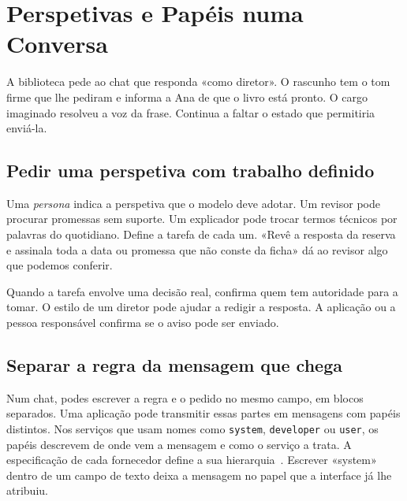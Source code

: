 \chapter{Perspetivas e Papéis numa Conversa}
\label{ch:personas}

\ficcao A biblioteca pede ao chat que responda «como diretor». O rascunho tem o tom firme que lhe pediram e informa a Ana de que o livro está pronto. O cargo imaginado resolveu a voz da frase. Continua a faltar o estado que permitiria enviá-la.

\section{Pedir uma perspetiva com trabalho definido}

Uma \emph{persona} indica a perspetiva que o modelo deve adotar. Um revisor pode procurar promessas sem suporte. Um explicador pode trocar termos técnicos por palavras do quotidiano. Define a tarefa de cada um. «Revê a resposta da reserva e assinala toda a data ou promessa que não conste da ficha» dá ao revisor algo que podemos conferir.

Quando a tarefa envolve uma decisão real, confirma quem tem autoridade para a tomar. O estilo de um diretor pode ajudar a redigir a resposta. A aplicação ou a pessoa responsável confirma se o aviso pode ser enviado.

\section{Separar a regra da mensagem que chega}

Num chat, podes escrever a regra e o pedido no mesmo campo, em blocos separados. Uma aplicação pode transmitir essas partes em mensagens com papéis distintos. Nos serviços que usam nomes como \texttt{system}, \texttt{developer} ou \texttt{user}, os papéis descrevem de onde vem a mensagem e como o serviço a trata. A especificação de cada fornecedor define a sua hierarquia~\citep{modelspec2026}. Escrever «system» dentro de um campo de texto deixa a mensagem no papel que a interface já lhe atribuiu.

